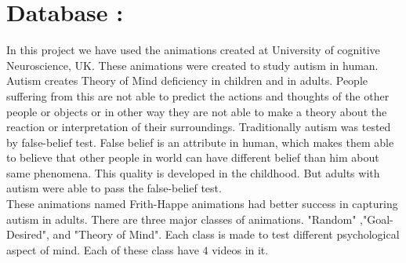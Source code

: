 \documentclass[11pt]{report}
\begin{document}
\section*{Database :}
In this project we have used the animations\cite{fhanimation} created at University of cognitive Neuroscience, UK. These animations were created to study autism in human. Autism creates Theory of Mind deficiency in children and in adults. People suffering from this are not able to predict the actions and thoughts of the other people or objects or in other way they are not able to make a theory about the reaction or interpretation of their surroundings. Traditionally autism was tested by false-belief test. False belief is an attribute in human, which makes them able to believe that other people in world can have different belief than him about same phenomena. This quality is developed in the childhood. But adults with autism were able to pass the false-belief test.\\
\hspace*{10pt} These animations named Frith-Happe animations had better success in capturing autism in adults. There are three major classes of animations. "Random" ,"Goal-Desired", and "Theory of Mind". Each class is made to test different psychological aspect of mind. Each of these class have $4$ videos in it.\\
\end{document}
